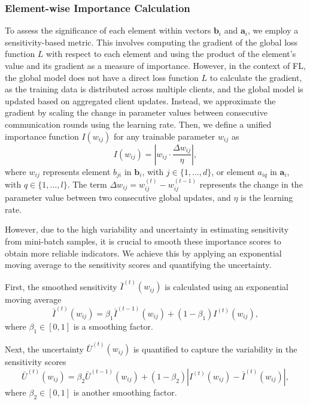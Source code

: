 \documentclass[journal]{IEEEtran}
\begin{document}
\subsubsection{Element-wise Importance Calculation}
To assess the significance of each element within vectors \(\mathbf{b}_i\) and \(\mathbf{a}_i\), we employ a sensitivity-based metric\cite{Molchanov_2019}. This involves computing the gradient of the global loss function \(L\) with respect to each element and using the product of the element's value and its gradient as a measure of importance. However, in the context of FL, the global model does not have a direct loss function $L$ to calculate the gradient, as the training data is distributed across multiple clients, and the global model is updated based on aggregated client updates. Instead, we approximate the gradient by scaling the change in parameter values between consecutive communication rounds using the learning rate.
Then, we define a unified importance function \(I(w_{ij})\) for any trainable parameter \(w_{ij}\) as
\begin{equation}
I(w_{ij}) = \left| w_{ij} \cdot \frac{\Delta w_{ij}}{\eta} \right|,
\end{equation}
where \(w_{ij}\) represents element \(b_{ji}\) in \(\mathbf{b}_i\), with \(j \in \{1, \ldots, d\}\), or element \(a_{iq}\) in \(\mathbf{a}_i\), with \(q \in \{1, \ldots, l\}\). The term \(\Delta w_{ij} = w_{ij}^{(t)} - w_{ij}^{(t-1)}\) represents the change in the parameter value between two consecutive global updates, and $\eta$ is the learning rate.

However, due to the high variability and uncertainty in estimating sensitivity from mini-batch samples, it is crucial to smooth these importance scores to obtain more reliable indicators. We achieve this by applying an exponential moving average to the sensitivity scores and quantifying the uncertainty\cite{DBLP:conf/icml/ZhangZLBHCZ22}.

First, the smoothed sensitivity \(\bar{I}^{(t)}(w_{ij})\) is calculated using an exponential moving average
\begin{equation}
\bar{I}^{(t)}(w_{ij}) = \beta_1 \bar{I}^{(t-1)}(w_{ij}) + (1 - \beta_1) I^{(t)}(w_{ij}),
\end{equation}
where \(\beta_1 \in [0,1]\) is a smoothing factor.

Next, the uncertainty \(\bar{U}^{(t)}(w_{ij})\) is quantified to capture the variability in the sensitivity scores
\begin{equation}
\bar{U}^{(t)}(w_{ij}) = \beta_2 \bar{U}^{(t-1)}(w_{ij}) + (1 - \beta_2) \left| I^{(t)}(w_{ij}) - \bar{I}^{(t)}(w_{ij}) \right|,
\end{equation}
where \(\beta_2 \in [0,1]\) is another smoothing factor.
\end{document}
